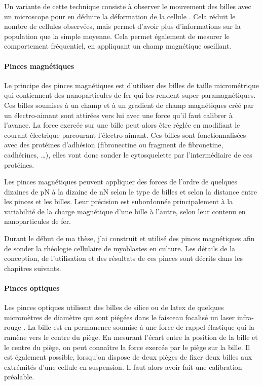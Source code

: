Un variante de cette technique consiste à observer le mouvement des billes avec un microscope pour en déduire la déformation de la cellule \parencite{fabry_scaling_2001}. Cela réduit le nombre de cellules observées, mais permet d'avoir plus d'informations sur la population que la simple moyenne. Cela permet également de mesurer le comportement fréquentiel, en appliquant un champ magnétique oscillant. 






\paragraph{Pinces magnétiques}

Le principe des pinces magnétiques est d'utiliser des billes de taille micrométrique qui contiennent des nanoparticules de fer qui les rendent super-paramagnétiques.
Ces billes soumises à un champ et à un gradient de champ magnétiques créé par un électro-aimant sont attirées vers lui avec une force qu'il faut calibrer à l'avance.
La force exercée sur une bille peut alors être réglée en modifiant le courant électrique parcourant l'électro-aimant.
Ces billes sont fonctionnalisées avec des protéines d'adhésion (fibronectine ou fragment de fibronetine, cadhérines, \dots), elles vont donc sonder le cytosquelette par l'intermédiaire de ces protéines. 


Les pinces magnétiques peuvent appliquer des forces de l'ordre de quelques dizaines de pN à la dizaine de nN selon le type de billes et selon la distance entre les pinces et les billes. 
Leur précision est subordonnée principalement à la variabilité de la charge magnétique d'une bille à l'autre, selon leur contenu en nanoparticules de fer. 


Durant le début de ma thèse, j'ai construit et utilisé des pinces magnétiques afin de sonder la rhéologie cellulaire de myoblastes en culture. Les détails de la conception, de l'utilisation et des résultats de ces pinces sont décrits dans les chapitres suivants. 


\paragraph{Pinces optiques}

Les pinces optiques utilisent des billes de silice ou de latex de quelques micromètres de diamètre qui sont piégées dans le faisceau focalisé un laser infra-rouge \parencite{neuman_optical_2004}.
La bille est en permanence soumise à une force de rappel élastique qui la ramène vers le centre du piège. 
En mesurant l'écart entre la position de la bille et le centre du piège, on peut connaître la force exercée par le piège sur la bille. 
Il est également possible, lorsqu'on dispose de deux pièges de fixer deux billes aux extrémités d'une cellule en suspension. Il faut alors avoir fait une calibration préalable. 

